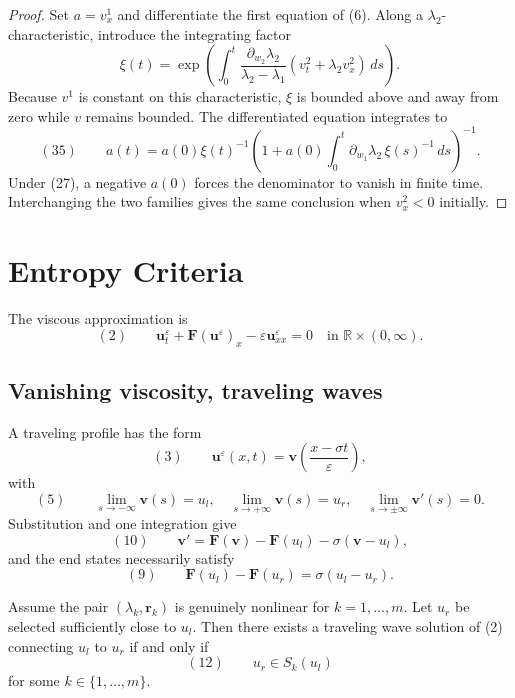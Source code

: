 \begin{proof}
\sketch Set $a=v^1_x$ and differentiate the first equation of (6). Along a $\lambda_2$-characteristic, introduce the integrating factor
\[
\xi(t)=\exp\!\left(\int_0^t
\frac{\partial_{w_2}\lambda_2}{\lambda_2-\lambda_1}
(v^2_t+\lambda_2v^2_x)\,ds\right).
\]
Because $v^1$ is constant on this characteristic, $\xi$ is bounded above and away from zero while $v$ remains bounded. The differentiated equation integrates to
\[
(35)\qquad
a(t)=a(0)\xi(t)^{-1}
\left(1+a(0)\int_0^t\partial_{w_1}\lambda_2\,\xi(s)^{-1}\,ds\right)^{-1}.
\]
Under (27), a negative $a(0)$ forces the denominator to vanish in finite time. Interchanging the two families gives the same conclusion when $v^2_x<0$ initially.
\end{proof}

\section{Entropy Criteria}\label{sec:entropy-criteria-systems}

The viscous approximation is
\[
(2)\qquad
\mathbf u_t^\varepsilon+\mathbf F(\mathbf u^\varepsilon)_x
-\varepsilon\mathbf u_{xx}^\varepsilon=0
\quad\text{in }\mathbb R\times(0,\infty).
\]

\subsection{Vanishing viscosity, traveling waves}\label{sec:vanishing-viscosity-traveling-waves}

A traveling profile has the form
\[
(3)\qquad \mathbf u^\varepsilon(x,t)
=\mathbf v\!\left(\frac{x-\sigma t}{\varepsilon}\right),
\]
with
\[
(5)\qquad
\lim_{s\to-\infty}\mathbf v(s)=u_l,
\quad \lim_{s\to+\infty}\mathbf v(s)=u_r,
\quad \lim_{s\to\pm\infty}\mathbf v'(s)=0.
\]
Substitution and one integration give
\[
(10)\qquad
\mathbf v'=\mathbf F(\mathbf v)-\mathbf F(u_l)-\sigma(\mathbf v-u_l),
\]
and the end states necessarily satisfy
\[
(9)\qquad \mathbf F(u_l)-\mathbf F(u_r)=\sigma(u_l-u_r).
\]

\begin{theorem}
\label{thm:existence-traveling-waves-genuinely-nonlinear}

Assume the pair $(\lambda_k, \mathbf{r}_k)$ is genuinely nonlinear for $k=1,\ldots,m$. Let $u_r$ be selected sufficiently close to $u_l$. Then there exists a traveling wave solution of (2) connecting $u_l$ to $u_r$ if and only if
$$(12) \qquad u_r \in S_k(u_l)$$
for some $k\in\{1,\ldots,m\}$.
\end{theorem}


